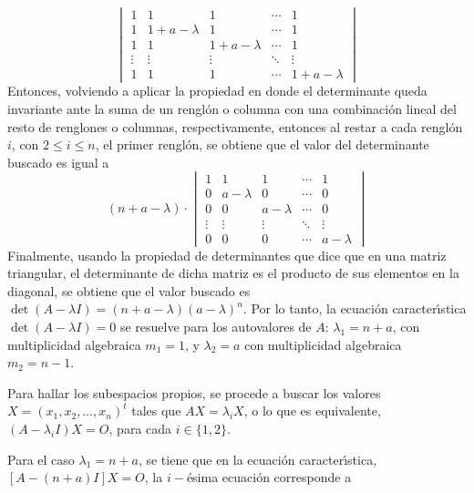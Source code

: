 \begin{solucion}
\begin{equation*}
  \begin{vmatrix}
   1 & 1               & 1            &         \cdots & 1 \\ 
   1 & 1 + a - \lambda & 1               &         \cdots & 1 \\
   1 & 1               & 1 + a - \lambda & \cdots & 1 \\
   \vdots & \vdots & \vdots & \ddots & \vdots \\
   1 & 1               & 1               & \cdots & 1 + a - \lambda
  \end{vmatrix}
 \end{equation*}
 Entonces, volviendo a aplicar la propiedad en donde el determinante queda invariante ante la suma de un rengl\'on o columna con una combinaci\'on lineal del resto de renglones o columnas, respectivamente, entonces al restar a cada rengl\'on $i$, con $2 \leq i \leq n$, el primer rengl\'on, se obtiene que el valor del determinante buscado es igual a
 \begin{equation*}
  (n+a-\lambda)\cdot 
  \begin{vmatrix}
   1 & 1           & 1           &         \cdots & 1 \\ 
   0 & a - \lambda & 0           &         \cdots & 0 \\
   0 & 0           & a - \lambda & \cdots & 0 \\
   \vdots & \vdots & \vdots & \ddots & \vdots \\
   0 & 0           & 0           & \cdots & a - \lambda
  \end{vmatrix}
 \end{equation*}
 Finalmente, usando la propiedad de determinantes que dice que en una matriz triangular, el determinante de dicha matriz es el producto de sus elementos en la diagonal, se obtiene que el valor buscado es $\det(A - \lambda I) = (n + a - \lambda)(a - \lambda)^n$. Por lo tanto, la ecuaci\'on caracter\'{\i}stica $\det(A - \lambda I) = 0$ se resuelve para los autovalores de $A$: $\lambda_1 = n+a$, con multiplicidad algebraica $m_1 = 1$, y $\lambda_2 = a$ con multiplicidad algebraica $m_2 = n - 1$.
 \par 
 Para hallar los subespacios propios, se procede a buscar los valores $X = (x_1, x_2, \ldots, x_n)^t$ tales que $AX = \lambda_i X$, o lo que es equivalente, $(A-\lambda_i I)X = O$, para cada $i \in \{ 1, 2 \}$.
 \par 
 Para el caso $\lambda_1 = n+a$, se tiene que en la ecuaci\'on caracter\'{\i}stica, $[A - (n+a)I]X = O$, la $i-$\'esima ecuaci\'on corresponde a

\end{solucion}
